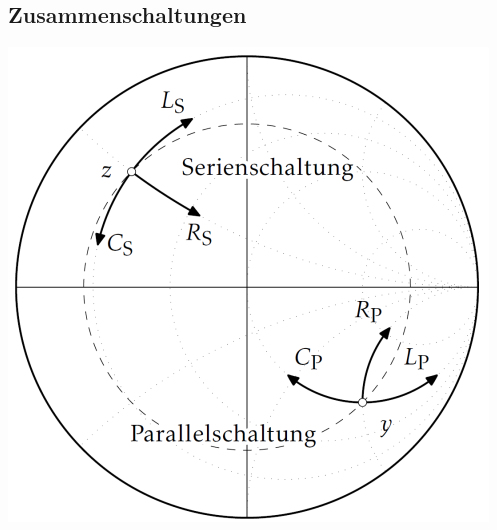 \subsection{Zusammenschaltungen}
\begin{center}
    \includegraphics[width=.45\columnwidth]{Figures/Smithdiagramm_Zusammenschaltungen.png}
\end{center}

\columnbreak

